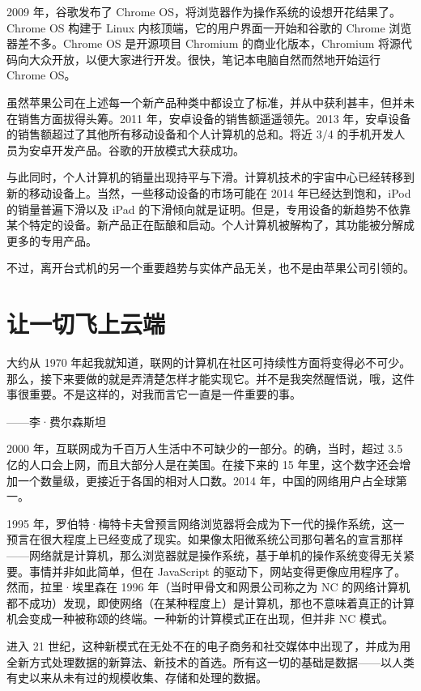 \documentclass[12pt,UTF8]{ctexbook}
\begin{document}
2009 年，谷歌发布了 Chrome OS，将浏览器作为操作系统的设想开花结果了。Chrome OS 构建于 Linux 内核顶端，它的用户界面一开始和谷歌的 Chrome 浏览器差不多。Chrome OS 是开源项目 Chromium 的商业化版本，Chromium 将源代码向大众开放，以便大家进行开发。很快，笔记本电脑自然而然地开始运行 Chrome OS。

虽然苹果公司在上述每一个新产品种类中都设立了标准，并从中获利甚丰，但并未在销售方面拔得头筹。2011 年，安卓设备的销售额遥遥领先。2013 年，安卓设备的销售额超过了其他所有移动设备和个人计算机的总和。将近 3/4 的手机开发人员为安卓开发产品。谷歌的开放模式大获成功。

与此同时，个人计算机的销量出现持平与下滑。计算机技术的宇宙中心已经转移到新的移动设备上。当然，一些移动设备的市场可能在 2014 年已经达到饱和，iPod 的销量普遍下滑以及 iPad 的下滑倾向就是证明。但是，专用设备的新趋势不依靠某个特定的设备。新产品正在酝酿和启动。个人计算机被解构了，其功能被分解成更多的专用产品。

不过，离开台式机的另一个重要趋势与实体产品无关，也不是由苹果公司引领的。





\section{让一切飞上云端}


大约从 1970 年起我就知道，联网的计算机在社区可持续性方面将变得必不可少。那么，接下来要做的就是弄清楚怎样才能实现它。并不是我突然醒悟说，哦，这件事很重要。不是这样的，对我而言它一直是一件重要的事。

——李·费尔森斯坦



2000 年，互联网成为千百万人生活中不可缺少的一部分。的确，当时，超过 3.5 亿的人口会上网，而且大部分人是在美国。在接下来的 15 年里，这个数字还会增加一个数量级，更接近于各国的相对人口数。2014 年，中国的网络用户占全球第一。

1995 年，罗伯特·梅特卡夫曾预言网络浏览器将会成为下一代的操作系统，这一预言在很大程度上已经变成了现实。如果像太阳微系统公司那句著名的宣言那样——网络就是计算机，那么浏览器就是操作系统，基于单机的操作系统变得无关紧要。事情并非如此简单，但在 JavaScript 的驱动下，网站变得更像应用程序了。然而，拉里·埃里森在 1996 年（当时甲骨文和网景公司称之为 NC 的网络计算机都不成功）发现，即使网络（在某种程度上）是计算机，那也不意味着真正的计算机会变成一种被称颂的终端。一种新的计算模式正在出现，但并非 NC 模式。

进入 21 世纪，这种新模式在无处不在的电子商务和社交媒体中出现了，并成为用全新方式处理数据的新算法、新技术的首选。所有这一切的基础是数据——以人类有史以来从未有过的规模收集、存储和处理的数据。
\end{document}
